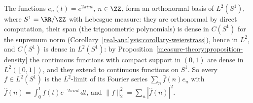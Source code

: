 \begin{example}\label{functional-analysis:example-fourier}
The functions $e_n(t) = e^{2\pi int}$, $n \in \ZZ$, form an orthonormal basis of $L^2(S^1)$, where $S^1 = \RR/\ZZ$ with Lebesgue measure: they are orthonormal by direct computation, their span (the
trigonometric polynomials) is dense in $C(S^1)$ for the supremum norm (Corollary~\ref{real-analysis:corollary-weierstrass}), hence in $L^2$, and $C(S^1)$ is dense in $L^2(S^1)$: by
Proposition~\ref{measure-theory:proposition-density} the continuous functions with compact support in $(0, 1)$ are dense in $L^2([0, 1])$, and they extend to continuous functions on $S^1$. So every $f \in L^2(S^1)$ is the $L^2$-limit of its Fourier series $\sum_n\hat f(n)e_n$ with $\hat f(n) = \int_0^1f(t)e^{-2\pi int}\,dt$, and
$\|f\|_2^2 = \sum_n|\hat f(n)|^2$.
\end{example}

